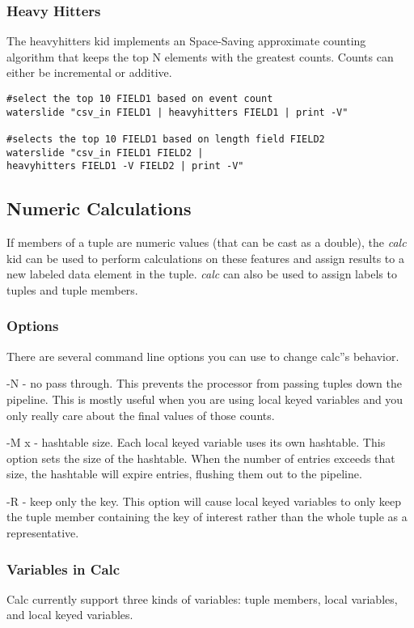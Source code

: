 \documentclass[11pt]{article}
\begin{document}
\subsubsection{Heavy Hitters}
The heavyhitters kid implements an Space-Saving approximate counting algorithm \cite{heavyhitters} that keeps the top N elements with the greatest counts.  Counts can either be incremental or additive.  
\begin{lstlisting}
#select the top 10 FIELD1 based on event count
waterslide "csv_in FIELD1 | heavyhitters FIELD1 | print -V"

#selects the top 10 FIELD1 based on length field FIELD2
waterslide "csv_in FIELD1 FIELD2 |
heavyhitters FIELD1 -V FIELD2 | print -V"
\end{lstlisting}


\subsection {Numeric Calculations}
If members of a tuple are numeric values (that can be cast as a
double), the \emph{calc} kid can be used to perform calculations on
these features and assign results to a new labeled data element in the
tuple.  \emph{calc} can also be used to assign labels to tuples and
tuple members. 

\subsubsection {Options}

There are several command line options you can use to change calc''s behavior.

-N - no pass through.  This prevents the processor from passing tuples down the pipeline.
This is mostly useful when you are using local keyed variables and you only really care
about the final values of those counts. 

-M x - hashtable size.  Each local keyed variable uses its own hashtable.  This option
sets the size of the hashtable.  When the number of entries exceeds that size, the
hashtable will expire entries, flushing them out to the pipeline.

-R - keep only the key.  This option will cause local keyed variables to only keep the
tuple member containing the key of interest rather than the whole tuple as a 
representative. 

\subsubsection {Variables in Calc}
Calc currently support three kinds of variables: tuple members, local variables, and local 
keyed variables.  
\end{document}
